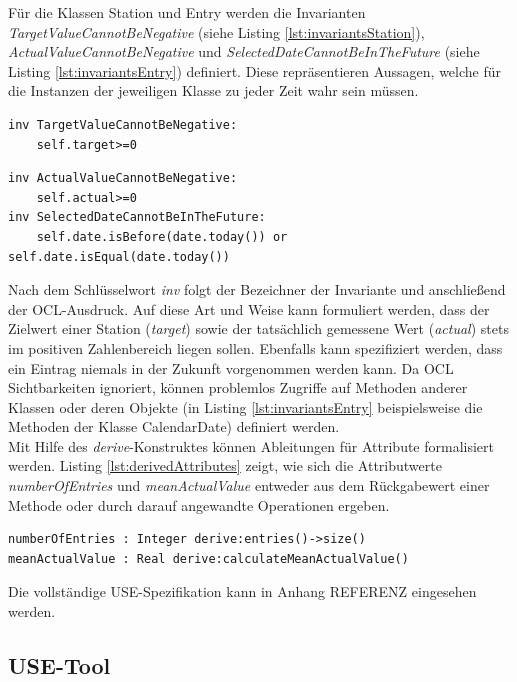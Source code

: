 \documentclass[a4paper,twoside]{article}
\begin{document}
Für die Klassen Station und Entry werden die Invarianten \textit{TargetValueCannotBeNegative} (siehe Listing \ref{lst:invariantsStation}), \textit{ActualValueCannotBeNegative} und \textit{SelectedDateCannotBeInTheFuture} (siehe Listing \ref{lst:invariantsEntry}) definiert. Diese repräsentieren Aussagen, welche für die Instanzen der jeweiligen Klasse zu jeder Zeit wahr sein müssen. \cite[S.188]{OCLFormal}

\begin{lstlisting}[caption={Invariante in der Klasse Station},label=lst:invariantsStation]
inv TargetValueCannotBeNegative:
	self.target>=0
\end{lstlisting}
\begin{lstlisting}[caption={Invarianten in der Klasse Entry},label=lst:invariantsEntry]
inv ActualValueCannotBeNegative:
	self.actual>=0	
inv SelectedDateCannotBeInTheFuture:
	self.date.isBefore(date.today()) or self.date.isEqual(date.today())
\end{lstlisting}

Nach dem Schlüsselwort \textit{inv} folgt der Bezeichner der Invariante und anschließend der OCL-Ausdruck. Auf diese Art und Weise kann formuliert werden, dass der Zielwert einer Station (\textit{target}) sowie der tatsächlich gemessene Wert (\textit{actual}) stets im positiven Zahlenbereich liegen sollen. Ebenfalls kann spezifiziert werden, dass ein Eintrag niemals in der Zukunft vorgenommen werden kann. Da OCL Sichtbarkeiten ignoriert, können problemlos Zugriffe auf Methoden anderer Klassen oder deren Objekte (in Listing \ref{lst:invariantsEntry} beispielsweise die Methoden der Klasse CalendarDate) definiert werden. \cite[S.71]{OCLFormal}\\
Mit Hilfe des \textit{derive}-Konstruktes können Ableitungen für Attribute formalisiert werden. Listing \ref{lst:derivedAttributes} zeigt, wie sich die Attributwerte \textit{numberOfEntries} und \textit{meanActualValue} entweder aus dem Rückgabewert einer Methode oder durch darauf angewandte Operationen ergeben.
\begin{lstlisting}[caption={Abgeleitete Attribute der Klasse Station},label=lst:derivedAttributes]
numberOfEntries : Integer derive:entries()->size()
meanActualValue : Real derive:calculateMeanActualValue()
\end{lstlisting}

Die vollständige USE-Spezifikation kann in Anhang REFERENZ eingesehen werden.
\subsection{USE-Tool}
\end{document}
